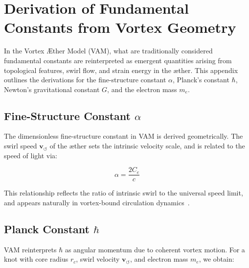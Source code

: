 \documentclass[preprint]{revtex4-2}
\begin{document}
    \appendix
        \section{Derivation of Fundamental Constants from Vortex Geometry}\label{sec:constants_derivation}
            In the Vortex \AE{}ther Model (VAM), what are traditionally considered fundamental constants are reinterpreted as emergent quantities arising from topological features, swirl flow, and strain energy in the æther. This appendix outlines the derivations for the fine-structure constant \( \alpha \), Planck’s constant \( \hbar \), Newton’s gravitational constant \( G \), and the electron mass \( m_e \).
        
            \subsection{Fine-Structure Constant \boldmath\( \alpha \)}
            The dimensionless fine-structure constant in VAM is derived geometrically. The swirl speed \( \mathbf{v}_{\scriptscriptstyle\boldsymbol{\circlearrowleft}} \) of the æther sets the intrinsic velocity scale, and is related to the speed of light via:
        
            \begin{equation}
            \alpha = \frac{2C_e}{c}
            \label{eq:fine_structure_vam}
            \end{equation}
        
            This relationship reflects the ratio of intrinsic swirl to the universal speed limit, and appears naturally in vortex-bound circulation dynamics~\cite{volovik2003universe, ranada1990topological}.
        
            \subsection{Planck Constant \boldmath\( \hbar \)}
            VAM reinterprets \( \hbar \) as angular momentum due to coherent vortex motion. For a knot with core radius \( r_c \), swirl velocity \( \mathbf{v}_{\scriptscriptstyle\boldsymbol{\circlearrowleft}} \), and electron mass \( m_e \), we obtain:
        
\end{document}
